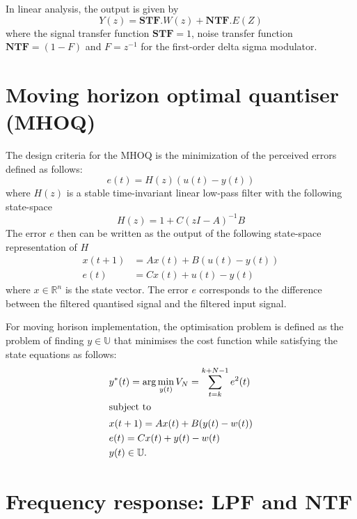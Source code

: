 \documentclass[a4paper]{article}
\begin{document}
In linear analysis, the output is given by 
\begin{equation}
	Y(z) = \textbf{STF}. W(z) + \textbf{NTF} .E(Z)
\end{equation}
where the signal transfer function $\textbf{STF} = 1$, noise transfer function $\textbf{NTF} =  (1-F)$ 
and $F = z^{-1}$ for the first-order delta sigma modulator. 

\section{Moving horizon optimal quantiser (MHOQ)}
The design criteria for the MHOQ is the minimization of the perceived errors defined as follows:
\begin{equation}
	e(t) = H(z)(u(t)-y(t))
	\label{eq:error1}
\end{equation}
where  $H(z)$  is  a stable time-invariant linear low-pass filter with the following state-space
\begin{equation}
	\label{eq:filter_statespace}
	H(z) = 1 + C(z I - A)^{-1} B
\end{equation}
The error $e$  then can be written as the output of the following state-space representation of $H$
\begin{equation}
	\begin{aligned}
		x(t+1) &= A x(t) + B (u(t)-y(t))		\\
		e(t) &= Cx(t) + u(t)-y(t)
	\end{aligned}
	\label{eq:statespace1}
\end{equation}
where $x \in \mathbb{R}^{n}$ is the state vector.  The error $e$ corresponds to the difference between the filtered quantised signal and the filtered input signal. 

For moving horison implementation, the optimisation problem is defined as the problem of finding $y \in \mathbb{U}$ that minimises  the cost function  while satisfying the state equations as follows:
\begin{align}
		& y^{\ast}(t) = \arg  \min_{y(t) }	V_{N}  = \sum_{t=k}^{k+N-1} e^{2}(t) \\
		\intertext{subject to}
		&x(t+1) = A x(t) + B (y(t)-w(t))		\\
		&e(t) = Cx(t) + y(t)-w(t)		\\
		&y(t) \in \mathbb{U}.
	\end{align}

\section{Frequency response: LPF and NTF}
\end{document}
